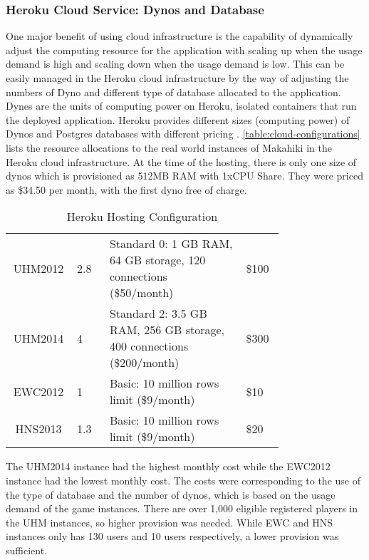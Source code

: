 \subsubsection{Heroku Cloud Service: Dynos and Database}

One major benefit of using cloud infrastructure is the capability of dynamically adjust the computing resource for the application with scaling up when the usage demand is high and scaling down when the usage demand is low. This can be easily managed in the Heroku cloud infrastructure by the way of adjusting the numbers of Dyno and different type of database allocated to the application. Dynes are the units of computing power on Heroku, isolated containers that run the deployed application. Heroku provides different sizes (computing power) of Dynos and Postgres databases with different pricing \cite{heroku-pricing}. \autoref{table:cloud-configurations} lists the resource allocations to the real world instances of Makahiki in the Heroku cloud infrastructure. At the time of the hosting, there is only one size of dynos which is provisioned as 512MB RAM with 1xCPU Share. They were priced as \$34.50 per month, with the first dyno free of charge.

\begin{table}[ht!]
  \centering
  \begin{tabular} {|c|P{0.12\linewidth}|P{0.5\linewidth}|P{0.14\linewidth}|}
    \hline
     &
     &
     &
     \\
    \hline
    UHM2012 & 2.8 & Standard 0:  1 GB RAM, 64 GB storage, 120 connections (\$50/month) & \$100 \\
    \hline
    UHM2014 & 4 & Standard 2: 3.5 GB RAM, 256 GB storage, 400 connections (\$200/month) & \$300 \\
    \hline
    EWC2012 & 1 & Basic: 10 million rows limit (\$9/month) & \$10 \\
    \hline
    HNS2013 & 1.3 & Basic: 10 million rows limit (\$9/month) & \$20 \\
    \hline
  \end{tabular}
  \caption{Heroku Hosting Configuration}
  \label{table:cloud-configurations}
\end{table}

The UHM2014 instance had the highest monthly cost while the EWC2012 instance had the lowest monthly cost. The costs were corresponding to the use of the type of database and the number of dynos, which is based on the usage demand of the game instances. There are over 1,000 eligible registered players in the UHM instances, so higher provision was needed. While EWC and HNS instances only has 130 users and 10 users respectively, a lower provision was sufficient. 

